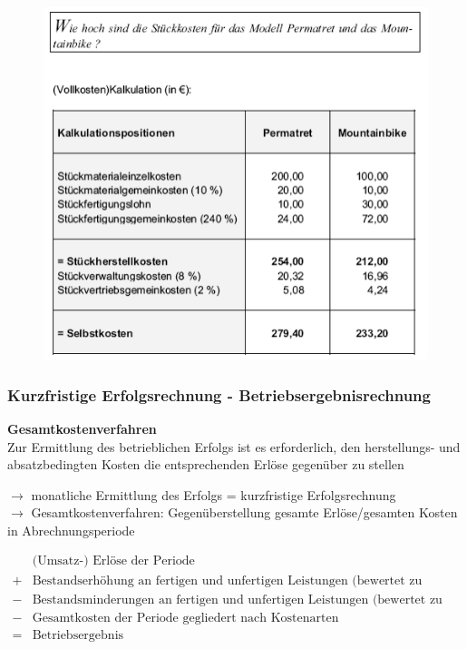 \documentclass[a4paper,11pt, twoside]{article}
\begin{document}
\begin{figure}[h]
 \begin{center}
   \includegraphics[scale=0.5]{bilder/beispiel_zuschlagskalkulation2.png}
 \end{center}
\end{figure}

\subsubsection*{Kurzfristige Erfolgsrechnung - Betriebsergebnisrechnung}

\textbf{Gesamtkostenverfahren}\\
Zur Ermittlung des betrieblichen Erfolgs ist es erforderlich, den herstellungs- und absatzbedingten Kosten die entsprechenden Erlöse gegenüber zu stellen

$\rightarrow$ monatliche Ermittlung des Erfolgs = kurzfristige Erfolgsrechnung\\
$\rightarrow$ Gesamtkostenverfahren: Gegenüberstellung gesamte Erlöse/gesamten Kosten in Abrechnungsperiode

\begin{equation}
\begin{aligned}
 & \text{(Umsatz-) Erlöse der Periode}\\
 + & \text{Bestandserhöhung an fertigen und unfertigen Leistungen (bewertet zu Herstellungskosten)}\\
 - & \text{Bestandsminderungen an fertigen und unfertigen Leistungen (bewertet zu Herstellungskosten)}\\
 - & \text{Gesamtkosten der Periode gegliedert nach Kostenarten}\\\hline
 = & \text{Betriebsergebnis}
 & \end{aligned}
\end{equation}
\end{document}
